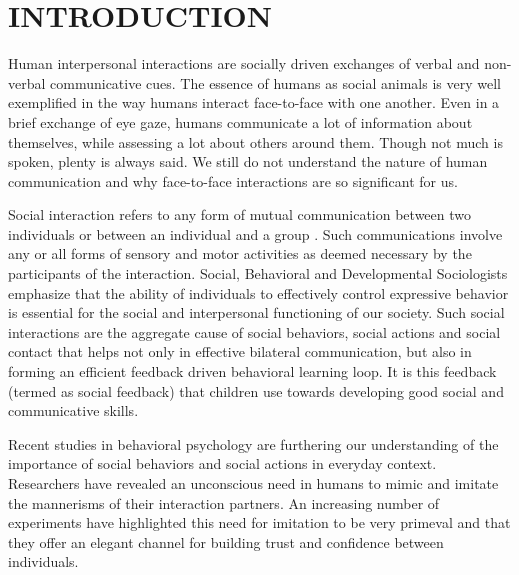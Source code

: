 \documentclass[oneside,11pt]{memoir}
\begin{document}
\pagestyle{plain} 

\chapter{INTRODUCTION} 

\DoubleSpacing
\setlength{\parindent}{.5in}
Human interpersonal interactions are socially driven exchanges of verbal and non-verbal communicative cues. The essence of humans as social animals is very well exemplified in the way humans interact face-to-face with one another. Even in a brief exchange of eye gaze, humans communicate a lot of information about themselves, while assessing a lot about others around them. Though not much is spoken, plenty is always said. We still do not understand the nature of human communication and why face-to-face interactions are so significant for us. 

Social interaction refers to any form of mutual communication between two individuals or between an individual and a group \cite{riggio_assessment_1986}. Such communications involve any or all forms of sensory and motor activities as deemed necessary by the participants of the interaction. Social, Behavioral and Developmental Sociologists emphasize that the ability of individuals to effectively control expressive behavior is essential for the social and interpersonal functioning of our society. Such social interactions are the aggregate cause of social behaviors, social actions and social contact that helps not only in effective bilateral communication, but also in forming an efficient feedback driven behavioral learning loop. It is this feedback (termed as social feedback) that children use towards developing good social and communicative skills. 

Recent studies in behavioral psychology are furthering our understanding of the importance of social behaviors and social actions in everyday context. Researchers have revealed an unconscious need in humans to mimic and imitate the mannerisms of their interaction partners. An increasing number of experiments have highlighted this need for imitation to be very primeval and that they offer an elegant channel for building trust and confidence between individuals.
\end{document}
